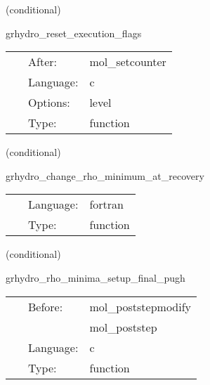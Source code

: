 \documentclass{article}
\begin{document}
\vspace{5mm}

   (conditional) 

\hspace{5mm} grhydro\_reset\_execution\_flags 

\hspace{5mm}{\it reset execution flags to 'yeah, execute'! } 


\hspace{5mm}

 \begin{tabular*}{160mm}{cll} 
~ & After:  & mol\_setcounter \\ 
~ & Language:  & c \\ 
~ & Options:  & level \\ 
~ & Type:  & function \\ 
\end{tabular*} 


\vspace{5mm}

   (conditional) 

\hspace{5mm} grhydro\_change\_rho\_minimum\_at\_recovery 

\hspace{5mm}{\it set up minimum for the rest-mass density in the atmosphere (before intial data) } 


\hspace{5mm}

 \begin{tabular*}{160mm}{cll} 
~ & Language:  & fortran \\ 
~ & Type:  & function \\ 
\end{tabular*} 


\vspace{5mm}

   (conditional) 

\hspace{5mm} grhydro\_rho\_minima\_setup\_final\_pugh 

\hspace{5mm}{\it set the value of the rest-mass density of the atmosphere which will be used during the evolution (pugh) } 


\hspace{5mm}

 \begin{tabular*}{160mm}{cll} 
~ & Before:  & mol\_poststepmodify \\ 
~& ~ &mol\_poststep\\ 
~ & Language:  & c \\ 
~ & Type:  & function \\ 
\end{tabular*} 
\end{document}
